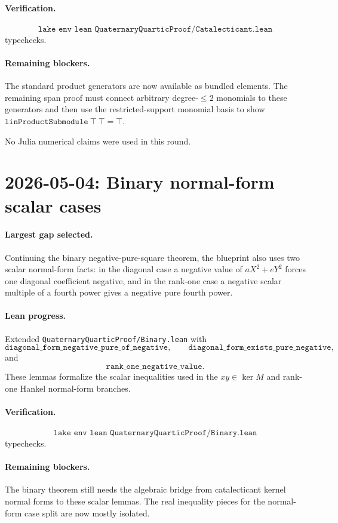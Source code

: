 \documentclass[11pt]{article}
\begin{document}
\paragraph{Verification.}
\[
\texttt{lake env lean QuaternaryQuarticProof/Catalecticant.lean}
\]
typechecks.

\paragraph{Remaining blockers.}
The standard product generators are now available as bundled elements.  The
remaining span proof must connect arbitrary degree-\(\le2\) monomials to
these generators and then use the restricted-support monomial basis to show
\(\texttt{linProductSubmodule}\ \top\ \top=\top\).

No Julia numerical claims were used in this round.

\section*{2026-05-04: Binary normal-form scalar cases}

\paragraph{Largest gap selected.}
Continuing the binary negative-pure-square theorem, the blueprint also uses
two scalar normal-form facts: in the diagonal case a negative value of
\(aX^2+eY^2\) forces one diagonal coefficient negative, and in the rank-one
case a negative scalar multiple of a fourth power gives a negative pure
fourth power.

\paragraph{Lean progress.}
Extended \texttt{QuaternaryQuarticProof/Binary.lean} with
\[
\texttt{diagonal\_form\_negative\_pure\_of\_negative},\qquad
\texttt{diagonal\_form\_exists\_pure\_negative},
\]
and
\[
\texttt{rank\_one\_negative\_value}.
\]
These lemmas formalize the scalar inequalities used in the \(xy\in\ker M\)
and rank-one Hankel normal-form branches.

\paragraph{Verification.}
\[
\texttt{lake env lean QuaternaryQuarticProof/Binary.lean}
\]
typechecks.

\paragraph{Remaining blockers.}
The binary theorem still needs the algebraic bridge from catalecticant kernel
normal forms to these scalar lemmas.  The real inequality pieces for the
normal-form case split are now mostly isolated.
\end{document}
